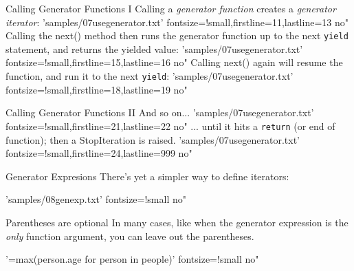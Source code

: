 \documentclass{pyslides}
\begin{document}
\begin{frame}[fragile]{Calling Generator Functions I}
Calling a \emph{generator function} creates a \emph{generator iterator}:
 'samples/07usegenerator.txt' fontsize=!small,firstline=11,lastline=13 no"
\bigskip
Calling the next() method then runs the generator function up to the next \texttt{yield} statement, and returns the yielded value:
 'samples/07usegenerator.txt' fontsize=!small,firstline=15,lastline=16 no"
\bigskip
Calling next() again will resume the function, and run it to the next \texttt{yield}:
 'samples/07usegenerator.txt' fontsize=!small,firstline=18,lastline=19 no"
\end{frame}

\begin{frame}[fragile]{Calling Generator Functions II}
And so on...
 'samples/07usegenerator.txt' fontsize=!small,firstline=21,lastline=22 no"
\bigskip
... until it hits a \texttt{return} (or end of function); then a StopIteration is raised.
 'samples/07usegenerator.txt' fontsize=!small,firstline=24,lastline=999 no"
\end{frame}

\begin{frame}[fragile]{Generator Expresions}
There's yet a simpler way to define iterators:

\bigskip

 'samples/08genexp.txt' fontsize=!small no"
\end{frame}

\begin{frame}[fragile]{Parentheses are optional}
In many cases, like when the generator expression is the \emph{only} function argument, you can leave out the parentheses.

\bigskip

 '=max(person.age for person in people)' fontsize=!small no"
\end{frame}
\end{document}
